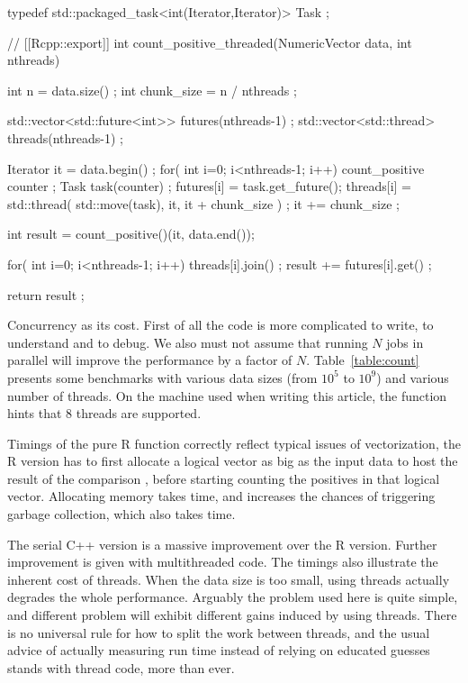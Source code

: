 \begin{example}
typedef std::packaged_task<int(Iterator,Iterator)> Task ;

// [[Rcpp::export]]
int count_positive_threaded(NumericVector data, int nthreads){
  int n = data.size() ;
  int chunk_size = n / nthreads ;

  std::vector<std::future<int>> futures(nthreads-1) ;
  std::vector<std::thread> threads(nthreads-1) ;

  Iterator it = data.begin() ;
  for( int i=0; i<nthreads-1; i++){
    count_positive counter ;
    Task task(counter) ;
    futures[i] = task.get_future();
    threads[i] = std::thread( std::move(task), it, it + chunk_size ) ;
    it += chunk_size ;
  }

  int result = count_positive()(it, data.end());

  for( int i=0; i<nthreads-1; i++){
    threads[i].join() ;
    result += futures[i].get() ;
  }

  return result ;
}
\end{example}

Concurrency as its cost. First of all the code is more complicated
to write, to understand and to debug. We also must not assume that
running $N$ jobs in parallel will improve the performance by a factor
of $N$. Table~\ref{table:count} presents some benchmarks with various
data sizes (from $10^5$ to $ 10^9$) and various number of threads.
On the machine used when writing this article,
the  function hints that 8 threads
are supported.

Timings of the pure R function correctly reflect typical issues of
vectorization, the R version has to first allocate a logical vector
as big as the input data to host the result of the comparison , before
starting counting the positives in that logical vector. Allocating
memory takes time, and increases the chances of triggering garbage collection,
which also takes time.

The serial C++ version is a massive improvement over the R version. Further
improvement is given with multithreaded code. The timings also illustrate
the inherent cost of threads. When the data size is too small, using threads
actually degrades the whole performance. Arguably the problem used here
is quite simple, and different problem will exhibit different gains
induced by using threads. There is no universal rule for how to split
the work between threads, and the usual advice of actually measuring
run time instead of relying on educated guesses stands with thread code, more than
ever.

